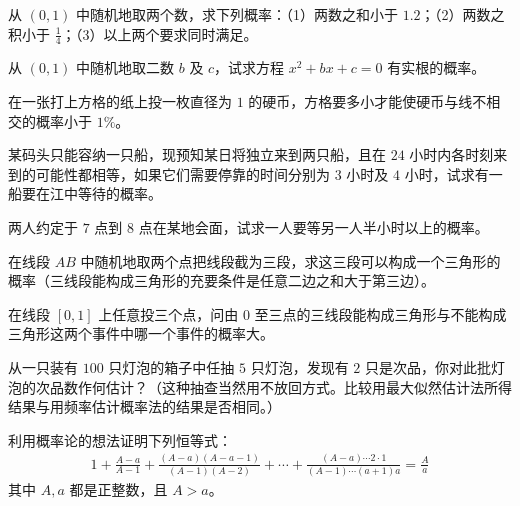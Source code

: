 \documentclass[../../main.tex]{subfiles}
\begin{document}
\begin{exercise}\label{exercise:ch01-24}
从 $(0,1)$ 中随机地取两个数，求下列概率：（1）两数之和小于 $1.2$；（2）两数之积小于 $\frac{1}{4}$；（3）以上两个要求同时满足。
\end{exercise}

\begin{exercise}\label{exercise:ch01-25}
从 $(0,1)$ 中随机地取二数 $b$ 及 $c$，试求方程 $x^2+bx+c=0$ 有实根的概率。
\end{exercise}

\begin{exercise}\label{exercise:ch01-26}
在一张打上方格的纸上投一枚直径为 $1$ 的硬币，方格要多小才能使硬币与线不相交的概率小于 $1\%$。
\end{exercise}

\begin{exercise}\label{exercise:ch01-27}
某码头只能容纳一只船，现预知某日将独立来到两只船，且在 $24$ 小时内各时刻来到的可能性都相等，如果它们需要停靠的时间分别为 $3$ 小时及 $4$ 小时，试求有一船要在江中等待的概率。
\end{exercise}

\begin{exercise}\label{exercise:ch01-28}
两人约定于 $7$ 点到 $8$ 点在某地会面，试求一人要等另一人半小时以上的概率。
\end{exercise}

\begin{exercise}\label{exercise:ch01-29}
在线段 $AB$ 中随机地取两个点把线段截为三段，求这三段可以构成一个三角形的概率（三线段能构成三角形的充要条件是任意二边之和大于第三边）。
\end{exercise}

\begin{exercise}\label{exercise:ch01-30}
在线段 $[0,1]$ 上任意投三个点，问由 $0$ 至三点的三线段能构成三角形与不能构成三角形这两个事件中哪一个事件的概率大。
\end{exercise}

\begin{exercise}\label{exercise:ch01-31}
从一只装有 $100$ 只灯泡的箱子中任抽 $5$ 只灯泡，发现有 $2$ 只是次品，你对此批灯泡的次品数作何估计？（这种抽查当然用不放回方式。比较用最大似然估计法所得结果与用频率估计概率法的结果是否相同。）
\end{exercise}

\begin{exercise}\label{exercise:ch01-32}
利用概率论的想法证明下列恒等式：
\begin{align*}
1+\frac{A-a}{A-1}+\frac{(A-a)(A-a-1)}{(A-1)(A-2)}+\cdots+\frac{(A-a)\cdots2\cdot1}{(A-1)\cdots(a+1)a}=\frac{A}{a}
\end{align*}
其中 $A,a$ 都是正整数，且 $A>a$。
\end{exercise}
\end{document}
